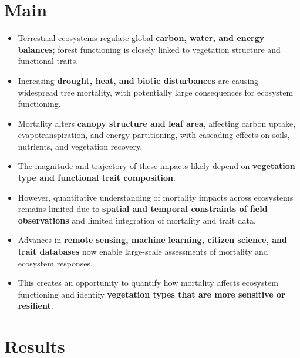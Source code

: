 \documentclass[11pt,a4paper]{article}
\begin{document}
\section*{Main}
    \begin{itemize}
    \item Terrestrial ecosystems regulate global \textbf{carbon, water, and energy balances}; forest functioning is closely linked to vegetation structure and functional traits.

    \item Increasing \textbf{drought, heat, and biotic disturbances} are causing widespread tree mortality, with potentially large consequences for ecosystem functioning.

    \item Mortality alters \textbf{canopy structure and leaf area}, affecting carbon uptake, evapotranspiration, and energy partitioning, with cascading effects on soils, nutrients, and vegetation recovery.

    \item The magnitude and trajectory of these impacts likely depend on \textbf{vegetation type and functional trait composition}.

    \item However, quantitative understanding of mortality impacts across ecosystems remains limited due to \textbf{spatial and temporal constraints of field observations} and limited integration of mortality and trait data.

    \item Advances in \textbf{remote sensing, machine learning, citizen science, and trait databases} now enable large-scale assessments of mortality and ecosystem responses.

    \item This creates an opportunity to quantify how mortality affects ecosystem functioning and identify \textbf{vegetation types that are more sensitive or resilient}.
\end{itemize}

\section*{Results}
\end{document}

